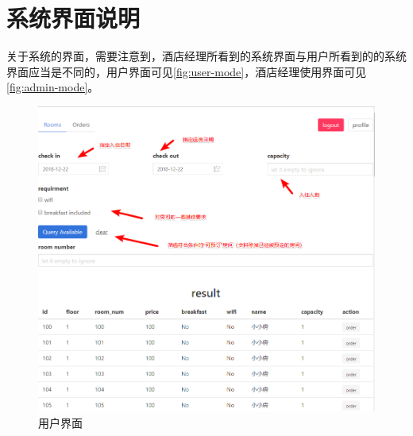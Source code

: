 \documentclass{myreport}
\begin{document}
\section{系统界面说明}

关于系统的界面，需要注意到，酒店经理所看到的系统界面与用户所看到的的系统界面应当是不同的，用户界面可见\autoref{fig:user-mode}，酒店经理使用界面可见\autoref{fig:admin-mode}。


\begin{figure}[htp]
    \centering
    \includegraphics[width=15cm]{figure/2018-12-22-14-57-11.png}
    \caption{用户界面}
    \label{fig:user-mode}
\end{figure}
\end{document}

